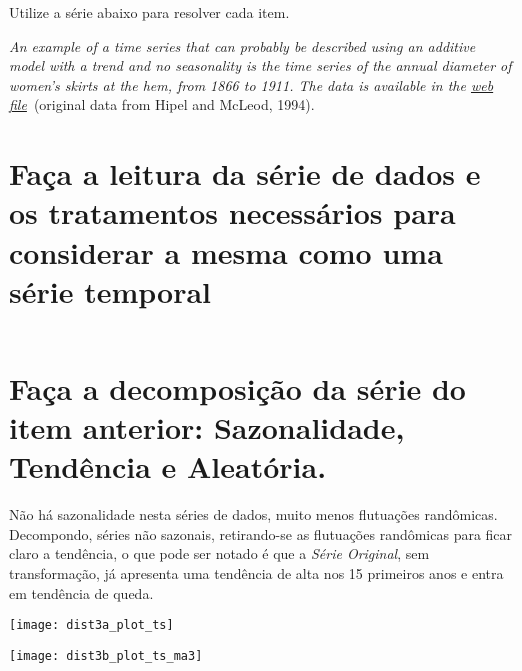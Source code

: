 Utilize a série abaixo para resolver cada item.

\emph{An example of a time series that can probably be described using an additive model with a trend and no seasonality is the time series of the annual diameter of women’s skirts at the hem, from 1866 to 1911. The data is available in the \href{http://robjhyndman.com/tsdldata/roberts/skirts.dat}{web file}} (original data from Hipel and McLeod, 1994).

\section{\label{sec:3a} Faça a leitura da série de dados e os tratamentos necessários para considerar a mesma como uma série temporal}

\inputminted{R}{Src/R/ex3a.R}

\section{Faça a decomposição da série do item anterior: Sazonalidade, Tendência e Aleatória.}
Não há sazonalidade nesta séries de dados, muito menos flutuações randômicas. Decompondo, séries não sazonais, retirando-se as flutuações randômicas para ficar claro a tendência, o que pode ser notado é que a \emph{Série Original}, sem transformação, já apresenta uma tendência de alta nos 15 primeiros anos e entra em tendência de queda.

\begin{center}
\begin{centering}
\texttt{[image: dist3a\_plot\_ts]}
\par\end{centering}
\par\end{center}

\begin{center}
\begin{centering}
\texttt{[image: dist3b\_plot\_ts\_ma3]}
\par\end{centering}
\par\end{center}

